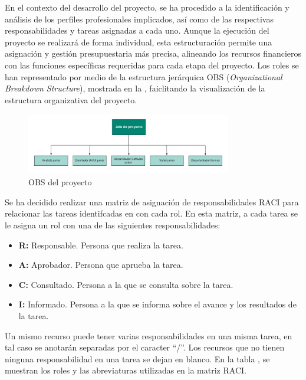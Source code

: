 
En el contexto del desarrollo del proyecto, se ha procedido a la identificación y análisis de los perfiles profesionales implicados, así como de las respectivas responsabilidades 
y tareas asignadas a cada uno. Aunque la ejecución del proyecto se realizará de forma individual, 
esta estructuración permite una asignación y gestión presupuestaria más precisa, alineando los recursos financieros con las funciones específicas requeridas para cada etapa del proyecto. 
Los roles se han representado por medio de la estructura jerárquica OBS (\textit{Organizational Breakdown Structure}), 
mostrada en la , 
faiclitando la visualización de la estructura organizativa del proyecto.

\begin{figure}[H]
    \centering
    \includegraphics[width=0.8\textwidth]{figures/5_OBS.png}
    \caption{OBS del proyecto}
    \label{fig:obs}
    \hypertarget{fig:obs}{}
\end{figure}



Se ha decidido realizar una matriz de asignación de responsabilidades RACI para relacionar las tareas identifcadas en  con cada rol.
En esta matriz, a cada tarea se le asigna un rol con una de las siguientes responsabilidades:
\begin{itemize}
    \item \textbf{\textcolor{Rcolor}{R}:} Responsable. Persona que realiza la tarea.
    \item \textbf{\textcolor{Acolor}{A}:} Aprobador. Persona que aprueba la tarea.
    \item \textbf{\textcolor{Ccolor}{C}:} Consultado. Persona a la que se consulta sobre la tarea.
    \item \textbf{\textcolor{Icolor}{I}:} Informado. Persona a la que se informa sobre el avance y los resultados de la tarea.
\end{itemize}
Un mismo recurso puede tener varias responsabilidades en una misma tarea, en tal caso se anotarán separadas por el caracter ``/''. 
Los recursos que no tienen ninguna responsabilidad en una tarea se dejan en blanco.
En la tabla , se muestran los roles y las abreviaturas utilizadas en la matriz RACI.

